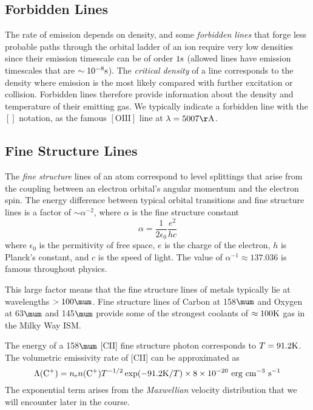 \documentclass[12pt]{article}
\begin{document}
\subsection{Forbidden Lines}
The rate of emission depends on density, and some {\it forbidden lines} that forge 
less probable paths through the orbital ladder of an ion require very low densities since
their emission timescale can be of order $1\mathrm{s}$ (allowed lines have emission timescales that
are $\sim10^{-8}\mathrm{s}$). The {\it critical density} of a line corresponds to the density where
emission is the most likely compared with further excitation or collision. Forbidden lines 
therefore provide information about the density and temperature of their emitting gas. We 
typically indicate a forbidden line with the $[]$ notation, as the famous $[\mathrm{OIII}]$
line at $\lambda=5007\Ang$.

\subsection{Fine Structure Lines}

The {\it fine structure} lines of an atom correspond to level splittings that arise from
the coupling between an electron orbital's angular momentum and the electron spin. The
energy difference between typical orbital transitions and fine structure lines is a 
factor of $\sim\alpha^{-2}$, where $\alpha$ is the fine structure constant
\begin{equation}
\alpha = \frac{1}{2\epsilon_{0}}\frac{e^2}{hc}
\end{equation}
\noindent
where $\epsilon_{0}$ is the permitivity of free space, $e$ is the
charge of the electron, $h$ is Planck's constant, and $c$ is the speed of light.
The value of $\alpha^{-1} \approx 137.036$ is famous throughout physics.

This large factor means that the fine structure lines of metals typically lie
at wavelengths $>100\mum$. Fine structure lines of Carbon at 158$\mum$
and Oxygen at 63$\mum$ and 145$\mum$ provide some of the strongest
coolants of $\approx100\mathrm{K}$ gas in the Milky Way ISM.

The energy of a 158$\mum$ [CII] fine structure photon corresponds to
$T=91.2\mathrm{K}$. The volumetric emissivity rate of [CII] can be approximated
as
\begin{equation}
\Lambda(\mathrm{C}^{+}) = n_{\mathrm{e}} n(\mathrm{C}^{+})T^{-1/2}\exp(-91.2\mathrm{K}/T) \times 8 \times 10^{-20}~\mathrm{erg}~\mathrm{cm}^{-3}~\mathrm{s}^{-1}
\end{equation}
\noindent
The exponential term arises from the {\it Maxwellian} velocity distribution 
that we will encounter later in the course.
\end{document}
